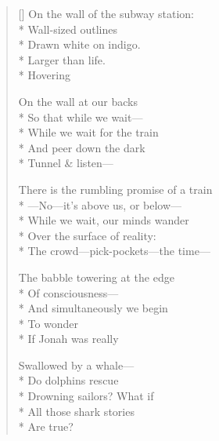 \label{ch:dolphins_eels_sea_turtles}
\settowidth{\versewidth}{          On the wall of the subway station:}
\begin{verse}[\versewidth]
\hspace*{1\vgap} On the wall of the subway station:\\*
Wall-sized outlines\\*
Drawn white on indigo.\\*
Larger than life.\\*
Hovering

On the wall at our backs\\*
So that while we wait---\\*
While we wait for the train\\*
And peer down the dark\\*
Tunnel \& listen---

There is the rumbling promise of a train\\*
---No---it's above us, or below---\\*
While we wait, our minds wander\\*
Over the surface of reality:\\*
The crowd---pick-pockets---the time---

The babble towering at the edge\\*
Of consciousness---\\*
And simultaneously we begin\\*
To wonder\\*
If Jonah was really

Swallowed by a whale---\\*
Do dolphins rescue\\*
Drowning sailors?     What if\\*
All those shark stories\\*
Are true?
\end{verse}

